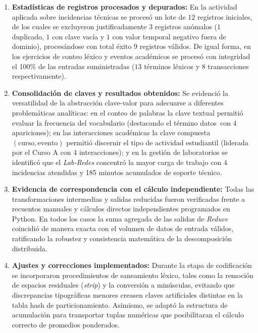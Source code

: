 \documentclass[12pt,a4paper]{article}
\begin{document}
\begin{enumerate}
    \item \textbf{Estadísticas de registros procesados y depurados:} En la actividad aplicada sobre incidencias técnicas se procesó un lote de $12$ registros iniciales, de los cuales se excluyeron justificadamente $3$ registros anómalos ($1$ duplicado, $1$ con clave vacía y $1$ con valor temporal negativo fuera de dominio), procesándose con total éxito $9$ registros válidos. De igual forma, en los ejercicios de conteo léxico y eventos académicos se procesó con integridad el 100\% de las entradas suministradas ($13$ términos léxicos y $8$ transacciones respectivamente).
    
    \item \textbf{Consolidación de claves y resultados obtenidos:} Se evidenció la versatilidad de la abstracción clave-valor para adecuarse a diferentes problemáticas analíticas: en el conteo de palabras la clave textual permitió evaluar la frecuencia del vocabulario (destacando el término \guillemotleft datos\guillemotright\ con 4 apariciones); en las interacciones académicas la clave compuesta $(\text{curso}, \text{evento})$ permitió discernir el tipo de actividad estudiantil (liderada por el Curso A con 4 interacciones); y en la gestión de laboratorios se identificó que el \textit{Lab-Redes} concentró la mayor carga de trabajo con 4 incidencias atendidas y 185 minutos acumulados de soporte técnico.
    
    \item \textbf{Evidencia de correspondencia con el cálculo independiente:} Todas las transformaciones intermedias y salidas reducidas fueron verificadas frente a recuentos manuales y cálculos directos independientes programados en Python. En todos los casos la suma agregada de las salidas de \textit{Reduce} coincidió de manera exacta con el volumen de datos de entrada válidos, ratificando la robustez y consistencia matemática de la descomposición distribuida.
    
    \item \textbf{Ajustes y correcciones implementados:} Durante la etapa de codificación se incorporaron procedimientos de saneamiento léxico, tales como la remoción de espacios residuales (\textit{strip}) y la conversión a minúsculas, evitando que discrepancias tipográficas menores creasen claves artificiales distintas en la tabla hash de particionamiento. Asimismo, se adaptó la estructura de acumulación para transportar tuplas numéricas que posibilitaran el cálculo correcto de promedios ponderados.
    

\end{enumerate}
\end{document}
